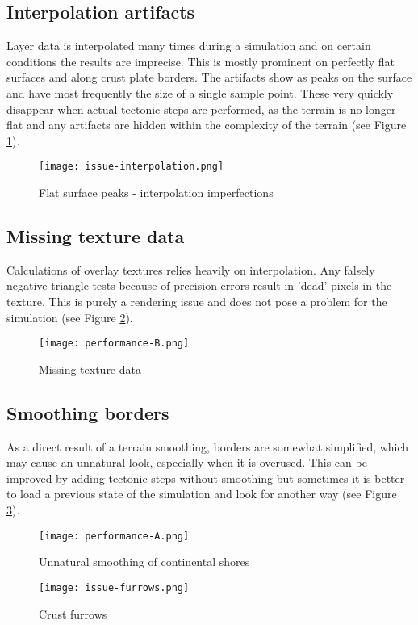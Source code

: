 \subsection{Interpolation artifacts}
Layer data is interpolated many times during a simulation and on certain conditions the results are imprecise. This is mostly prominent on perfectly flat surfaces and along crust plate borders. The artifacts show as peaks on the surface and have most frequently the size of a single sample point. These very quickly disappear when actual tectonic steps are performed, as the terrain is no longer flat and any artifacts are hidden within the complexity of the terrain (see Figure \ref{fig:issue-interpolation}).
\begin{figure}[ht!]
\centering
\texttt{[image: issue-interpolation.png]}
\caption{Flat surface peaks - interpolation imperfections}
\label{fig:issue-interpolation}
\end{figure}

\subsection{Missing texture data}
Calculations of overlay textures relies heavily on interpolation. Any falsely negative triangle tests because of precision errors result in 'dead' pixels in the texture. This is purely a rendering issue and does not pose a problem for the simulation (see Figure \ref{fig:issue-dead-pixels}).
\begin{figure}[ht!]
\centering
\texttt{[image: performance-B.png]}
\caption{Missing texture data}
\label{fig:issue-dead-pixels}
\end{figure}

\subsection{Smoothing borders}
As a direct result of a terrain smoothing, borders are somewhat simplified, which may cause an unnatural look, especially when it is overused. This can be improved by adding tectonic steps without smoothing but sometimes it is better to load a previous state of the simulation and look for another way (see Figure \ref{fig:issue-blobs}).
\begin{figure}[ht!]
\centering
\texttt{[image: performance-A.png]}
\caption{Unnatural smoothing of continental shores}
\label{fig:issue-blobs}
\end{figure}

\begin{figure}[ht!]
\centering
\texttt{[image: issue-furrows.png]}
\caption{Crust furrows}
\label{fig:crust-furrows}
\end{figure}

